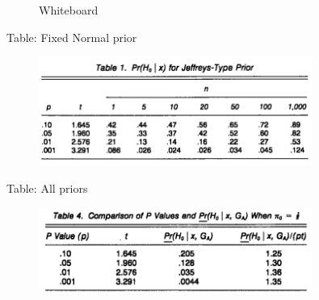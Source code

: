 


\begin{frame}

\begin{figure}[t]
\Large
Whiteboard
\centering
\end{figure}

\end{frame}


\begin{frame}{Table: Fixed Normal prior}

\begin{figure}[t]
\includegraphics[width=0.8\textwidth]{figures/table1}
\centering
\end{figure}

\end{frame}


%
%


\begin{frame}{Table: All priors}

\begin{figure}[t]
\includegraphics[width=0.8\textwidth]{figures/table4}
\centering
\end{figure}

\end{frame}



